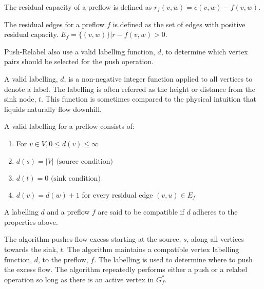 \begin{definition}
	The residual capacity of a preflow is defined as $r_f(v,w) = c(v,w)-f(v,w)$.
\end{definition}

\begin{definition}
	The residual edges for a preflow $f$ is defined as the set of edges with positive residual capacity. $E_f = \{(v,w)\} | r-f(v,w) > 0$.
\end{definition}

\begin{definition}[Labelling]
	Push-Relabel also use a valid labelling function, $d$, to determine which vertex pairs should be selected for the push operation.
	
	A valid labelling, $d$, is a non-negative integer function applied to all vertices to denote a label. The labelling is often referred as the height or distance from the sink node, $t$. This function is sometimes compared to the physical intuition that liquids naturally flow downhill.
	
	A valid labelling for a preflow consists of:
	\begin{enumerate}
		\item For $v \in V, 0 \leq d(v) \leq \infty$
		\item $d(s) = |V| \text{ (source condition)}$
		\item $d(t) = 0 \text{ (sink condition)}$
		\item $d(v) = d(w) + 1$ for every residual edge $(v,u) \in E_f$
	\end{enumerate}
	A labelling $d$ and a preflow $f$ are said to be compatible if $d$ adheres to the properties above.
	
	The algorithm pushes flow excess starting at the source, $s$, along all vertices towards the sink, $t$. The algorithm maintains a compatible vertex labelling function, $d$, to the preflow, $f$. The labelling is used to determine where to push the excess flow. The algorithm repeatedly performs either a push or a relabel operation so long as there is an active vertex in $G^*_f$.
\end{definition}


